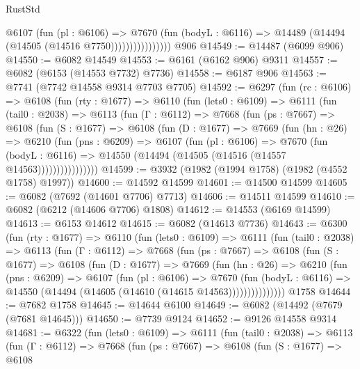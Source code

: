 \begin{lexlean}{RustStd}
\begin{coremodule}
                        @6107
                          (fun (pl : @6106) =>
                          @7670
                            (fun (bodyL : @6116) =>
                            @14489 (@14494 (@14505 (@14516 @7750))))))))))))))))
    @906
@14549 := @14487 (@6099 @906)
@14550 := @6082 @14549
@14553 := @6161 (@6162 @906) @9311
@14557 := @6082 (@6153 (@14553 @7732) @7736)
@14558 := @6187 @906
@14563 := @7741 (@7742 @14558 @9314 @7703 @7705)
@14592 := @6297
    (fun (rc : @6106) =>
    @6108
      (fun (rty : @1677) =>
      @6110
        (fun (lets0 : @6109) =>
        @6111
          (fun (tail0 : @2038) =>
          @6113
            (fun (Γ : @6112) =>
            @7668
              (fun (ps : @7667) =>
              @6108
                (fun (S : @1677) =>
                @6108
                  (fun (D : @1677) =>
                  @7669
                    (fun (hn : @26) =>
                    @6210
                      (fun (pns : @6209) =>
                      @6107
                        (fun (pl : @6106) =>
                        @7670
                          (fun (bodyL : @6116) =>
                          @14550 (@14494 (@14505 (@14516 (@14557 @14563))))))))))))))))
@14599 := @3932 (@1982 (@1994 @1758) (@1982 (@4552 @1758) @1997))
@14600 := @14592 @14599
@14601 := @14500 @14599
@14605 := @6082 (@7692 (@14601 @7706) @7713)
@14606 := @14511 @14599
@14610 := @6082 (@6212 (@14606 @7706) @1808)
@14612 := @14553 (@6169 @14599)
@14613 := @6153 @14612
@14615 := @6082 (@14613 @7736)
@14643 := @6300
    (fun (rty : @1677) =>
    @6110
      (fun (lets0 : @6109) =>
      @6111
        (fun (tail0 : @2038) =>
        @6113
          (fun (Γ : @6112) =>
          @7668
            (fun (ps : @7667) =>
            @6108
              (fun (S : @1677) =>
              @6108
                (fun (D : @1677) =>
                @7669
                  (fun (hn : @26) =>
                  @6210
                    (fun (pns : @6209) =>
                    @6107
                      (fun (pl : @6106) =>
                      @7670
                        (fun (bodyL : @6116) =>
                        @14550 (@14494 (@14605 (@14610 (@14615 @14563)))))))))))))))
    @1758
@14644 := @7682 @1758
@14645 := @14644 @6100
@14649 := @6082 (@14492 (@7679 (@7681 @14645)))
@14650 := @7739 @9124
@14652 := @9126 @14558 @9314
@14681 := @6322
    (fun (lets0 : @6109) =>
    @6111
      (fun (tail0 : @2038) =>
      @6113
        (fun (Γ : @6112) =>
        @7668
          (fun (ps : @7667) =>
          @6108
            (fun (S : @1677) =>
            @6108

\end{coremodule}
\end{lexlean}
